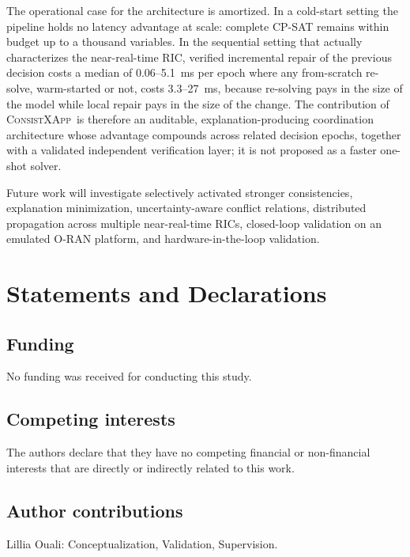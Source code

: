 \documentclass[pdflatex,sn-mathphys-num,iicol,oneside]{sn-jnl}
\newcommand{\method}{\textsc{ConsistXApp}}
\begin{document}
The operational case for the architecture is amortized. In a
cold-start setting the pipeline holds no latency advantage at scale:
complete CP-SAT remains within budget up to a thousand variables. In
the sequential setting that actually characterizes the near-real-time
RIC, verified incremental repair of the previous decision costs a
median of 0.06--5.1~ms per epoch where any from-scratch re-solve,
warm-started or not, costs 3.3--27~ms, because re-solving pays in the
size of the model while local repair pays in the size of the change.
The contribution of \method\ is therefore an auditable,
explanation-producing coordination architecture whose advantage
compounds across related decision epochs, together with a validated
independent verification layer; it is not proposed as a faster
one-shot solver.

Future work will investigate selectively activated stronger
consistencies, explanation minimization, uncertainty-aware conflict
relations, distributed propagation across multiple near-real-time
RICs, closed-loop validation on an emulated O-RAN platform, and
hardware-in-the-loop validation.

\section*{Statements and Declarations}

\subsection*{Funding}

No funding was received for conducting this study.

\subsection*{Competing interests}

The authors declare that they have no competing financial or
non-financial interests that are directly or indirectly related to
this work.

\subsection*{Author contributions}

Lillia Ouali: Conceptualization, Validation, Supervision.
\end{document}
